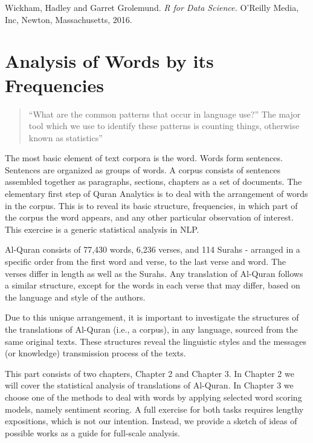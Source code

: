 \documentclass[
]{article}
\begin{document}
Wickham, Hadley and Garret Grolemund. \emph{R for Data Science.} O'Reilly Media, Inc, Newton, Massachusetts, 2016. \citep{wickham2016}

\hypertarget{analysis-of-words-by-its-frequencies}{%
\section*{Analysis of Words by its Frequencies}\label{analysis-of-words-by-its-frequencies}}

\begin{quote}
``What are the common patterns that occur in language use?'' The major tool which we use to identify these patterns is counting things, otherwise known as statistics'' \citep[pg. 4]{manning1999}
\end{quote}

The most basic element of text corpora is the word. Words form sentences. Sentences are organized as groups of words. A corpus consists of sentences assembled together as paragraphs, sections, chapters as a set of documents. The elementary first step of Quran Analytics is to deal with the arrangement of words in the corpus. This is to reveal its basic structure, frequencies, in which part of the corpus the word appears, and any other particular observation of interest. This exercise is a generic statistical analysis in NLP.

Al-Quran consists of 77,430 words, 6,236 verses, and 114 Surahs - arranged in a specific order from the first word and verse, to the last verse and word. The verses differ in length as well as the Surahs. Any translation of Al-Quran follows a similar structure, except for the words in each verse that may differ, based on the language and style of the authors.

Due to this unique arrangement, it is important to investigate the structures of the translations of Al-Quran (i.e., a corpus), in any language, sourced from the same original texts. These structures reveal the linguistic styles and the messages (or knowledge) transmission process of the texts.

This part consists of two chapters, Chapter 2 and Chapter 3. In Chapter 2 we will cover the statistical analysis of translations of Al-Quran. In Chapter 3 we choose one of the methods to deal with words by applying selected word scoring models, namely sentiment scoring. A full exercise for both tasks requires lengthy expositions, which is not our intention. Instead, we provide a sketch of ideas of possible works as a guide for full-scale analysis.
\end{document}
